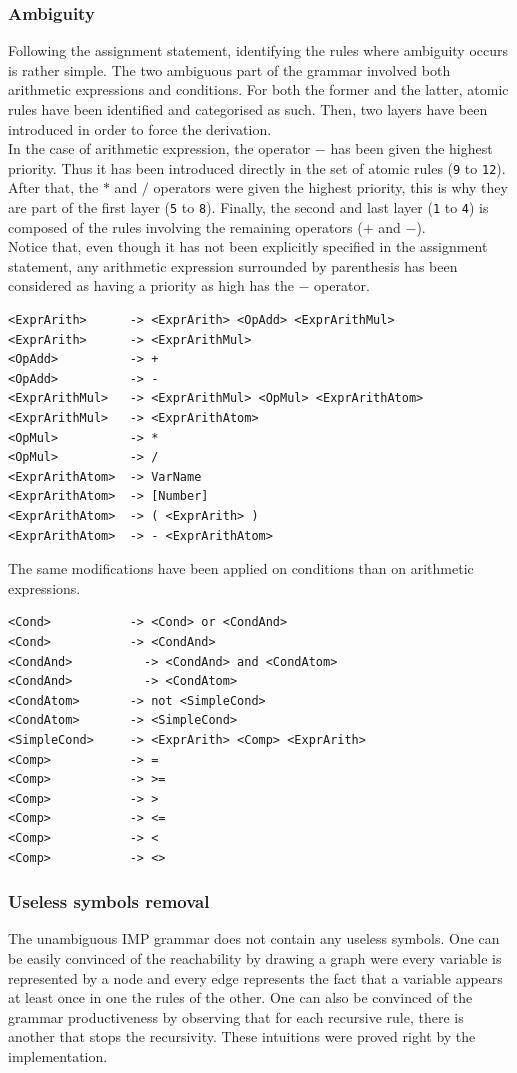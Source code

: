 \documentclass[a4paper,11pt]{article}
\begin{document}
    \subsubsection{Ambiguity}
      Following the assignment statement, identifying the rules where ambiguity occurs is rather simple. The two ambiguous part of the grammar involved both arithmetic expressions and conditions. For both the former and the latter, atomic rules have been identified and categorised as such. Then, two layers have been introduced in order to force the derivation.\\
      In the case of arithmetic expression, the operator $-$ has been given the highest priority. Thus it has been introduced directly in the set of atomic rules (\verb|9| to \verb|12|). After that, the $*$ and $/$ operators were given the highest priority, this is why they are part of the first layer (\verb|5| to \verb|8|). Finally, the second and last layer (\verb|1| to \verb|4|) is composed of the rules involving the remaining operators ($+$ and $-$).\\
      Notice that, even though it has not been explicitly specified in the assignment statement, any arithmetic expression surrounded by parenthesis has been considered as having a priority as high has the $-$ operator.
      \begin{lstlisting}
<ExprArith>	     -> <ExprArith> <OpAdd> <ExprArithMul> 
<ExprArith>	     -> <ExprArithMul> 
<OpAdd>	         -> + 
<OpAdd>	         -> - 
<ExprArithMul>	 -> <ExprArithMul> <OpMul> <ExprArithAtom> 
<ExprArithMul>	 -> <ExprArithAtom> 
<OpMul>	         -> * 
<OpMul>	         -> / 
<ExprArithAtom>	 -> VarName 
<ExprArithAtom>	 -> [Number] 
<ExprArithAtom>	 -> ( <ExprArith> ) 
<ExprArithAtom>	 -> - <ExprArithAtom>\end{lstlisting}
      The same modifications have been applied on conditions than on arithmetic expressions.
      \begin{lstlisting}
<Cond>	         -> <Cond> or <CondAnd> 
<Cond>	         -> <CondAnd> 
<CondAnd>	       -> <CondAnd> and <CondAtom> 
<CondAnd>	       -> <CondAtom> 
<CondAtom>	     -> not <SimpleCond> 
<CondAtom>	     -> <SimpleCond> 
<SimpleCond>     -> <ExprArith> <Comp> <ExprArith> 
<Comp>	         -> = 
<Comp>	         -> >= 
<Comp>	         -> >  
<Comp>	         -> <=  
<Comp>	         -> <  
<Comp>	         -> <>\end{lstlisting}

    \subsubsection{Useless symbols removal}
      The unambiguous IMP grammar does not contain any useless symbols. One can be easily convinced of the reachability by drawing a graph were every variable is represented by a node and every edge represents the fact that a variable appears at least once in one the rules of the other. One can also be convinced of the grammar productiveness by observing that for each recursive rule, there is another that stops the recursivity. These intuitions were proved right by the implementation.
      
\end{document}
